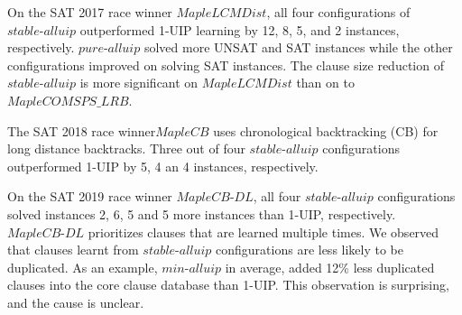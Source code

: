 \documentclass[runningheads]{llncs}
\newcommand{\oneuip}{1-UIP\xspace}
\newcommand{\stablealluip}{\textit{stable-alluip}\xspace}
\newcommand{\allUipPure}{\textit{pure-alluip}\xspace}
\newcommand{\allUipMin}{\textit{min-alluip}\xspace}
\newcommand{\MapleBase}{\textit{MapleCOMSPS\_LRB}}
\newcommand{\MapleSeven}{\textit{MapleLCMDist}}
\newcommand{\MapleNineShort}{\textit{MapleCB-DL} }
\newcommand{\MapleEightShort}{\textit{MapleCB}}
\begin{document}
On the SAT 2017 race winner $\MapleSeven$, all four configurations of
$\stablealluip$ outperformed \oneuip learning by 12, 8, 5, and 2 instances,
respectively. $\allUipPure$ solved more UNSAT and SAT instances while
the other configurations improved on solving SAT instances. The clause
size reduction of $\stablealluip$ is more significant on $\MapleSeven$
than on to $\MapleBase$.

The SAT 2018 race winner$\MapleEightShort$ uses chronological
backtracking (CB) for long distance backtracks. Three out of four
$\stablealluip$ configurations outperformed \oneuip by 5, 4 an 4 instances,
respectively.


On the SAT 2019 race winner $\MapleNineShort$, all four
$\stablealluip$ configurations solved instances 2, 6, 5 and 5 more instances
than \oneuip, respectively. $\MapleNineShort$ prioritizes clauses that
are learned multiple times. We observed that clauses learnt from
$\stablealluip$ configurations are less likely to be duplicated. As an
example, $\allUipMin$ in average, added 12\% less duplicated clauses
into the core clause database than \oneuip. This observation is
surprising, and the cause is unclear.

\end{document}
